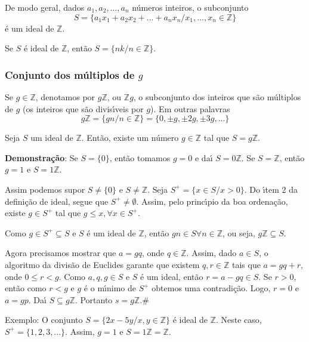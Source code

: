 De modo geral, dados $a_{1},a_{2},...,a_{n}$ n{\'u}meros inteiros, o subconjunto \[S=\{a_{1}x_{1}+a_{2}x_{2}+...+a_{n}x_{n}/x_{1},...,x_{n}\in\mathbb{Z}\}\] {\'e} um ideal de $\mathbb{Z}$.

Se $S$ {\'e} ideal de $\mathbb{Z}$, ent{\~a}o $S=\{nk/n\in\mathbb{Z}\}$.
\subsubsection{Conjunto dos m{\'u}ltiplos de $g$}
\begin{nota} Se $g\in\mathbb{Z}$, denotamos por $g\mathbb{Z}$, ou $\mathbb{Z}g$, o subconjunto dos inteiros que s{\~a}o m{\'u}ltiplos de $g$ (os inteiros que s{\~a}o divis{\'\i}veis por $g$). Em outras palavras \[g\mathbb{Z}=\{gn/n\in\mathbb{Z}\}=\{0,\pm g,\pm 2g,\pm 3g,...\}\]
\end{nota}

\begin{teorema} Seja $S$ um ideal de $\mathbb{Z}$. Ent{\~a}o, existe um n{\'u}mero $g\in\mathbb{Z}$ tal que $S=g\mathbb{Z}$.\end{teorema}

\textbf{Demonstra{\c c}{\~a}o}: Se $S=\{0\}$, ent{\~a}o tomamos $g=0$ e da{\'\i} $S=0\mathbb{Z}$. Se $S=\mathbb{Z}$, ent{\~a}o $g=1$ e $S=1\mathbb{Z}$.

Assim podemos supor $S\neq\{0\}$ e $S\neq\mathbb{Z}$. Seja $S^{+}=\{x\in S/x>0\}$. Do {\'\i}tem 2 da defini{\c c}{\~a}o de ideal, segue que $S^{+}\neq\emptyset$. Assim, pelo princ{\'\i}pio da boa ordena{\c c}{\~a}o, existe $g\in S^{+}$ tal que $g\leq x,\forall x\in S^{+}$.

Como $g\in S^{+}\subseteq S$ e $S$ {\'e} um ideal de $\mathbb{Z}$, ent{\~a}o $gn\in S\forall n\in\mathbb{Z}$, ou seja, $g\mathbb{Z}\subseteq S$.

Agora precisamos mostrar que $a=gq$, onde $q\in\mathbb{Z}$. Assim, dado $a\in S$, o algoritmo da divis{\~a}o de Euclides garante que existem $q,r\in\mathbb{Z}$ tais que $a=gq+r$, onde $0\leq r<g$. Como $a,q,g\in S$ e $S$ {\'e} um ideal, ent{\~a}o $r=a-gq\in S$. Se $r>0$, ent{\~a}o como $r<g$ e $g$ {\'e} o m{\'\i}nimo de $S^{+}$ obtemos uma contradi{\c c}{\~a}o. Logo, $r=0$ e $a=gp$. Da{\'\i} $S\subseteq g\mathbb{Z}$. Portanto $s=g\mathbb{Z}$.\#

Exemplo: O conjunto $S=\{2x-5y/x,y\in\mathbb{Z}\}$ {\'e} ideal de $\mathbb{Z}$. Neste caso,\\ $S^{+}=\{1,2,3,...\}$. Assim, $g=1$ e $S=1\mathbb{Z}=\mathbb{Z}$.